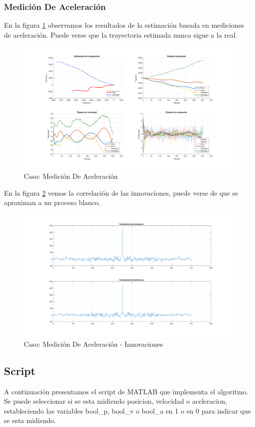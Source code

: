 		\subsubsection{Medición De Aceleración}
		
		En la figura \ref{fig:ej2c} observamos los resultados de la estimación basada en mediciones de aceleración. Puede verse que la trayectoria estimada nunca sigue a la real.
		
		\begin{figure}[H]
			\centering
			\includegraphics[width=1.0\textwidth,keepaspectratio]{Figuras/graf_ej2c.pdf}
			\caption{Caso: Medición De Aceleración}
			\label{fig:ej2c}
		\end{figure}
		
		En la figura \ref{fig:ej2c_innov} vemos la correlación de las innovaciones, puede verse de que se aproximan a un proceso blanco.
		
		\begin{figure}[H]
			\centering
			\includegraphics[width=1.0\textwidth,keepaspectratio]{Figuras/covinn_ej2c.pdf}
			\caption{Caso: Medición De Aceleración - Innovaciones}
			\label{fig:ej2c_innov}
		\end{figure}

	\subsection{Script}
	
		A continuación presentamos el script de MATLAB que implementa el algoritmo. Se puede seleccionar si se esta midiendo posicion, velocidad o aceleracion, estableciendo las variables bool\_p, bool\_v o bool\_a en 1 o en 0 para indicar que se esta midiendo.
	
